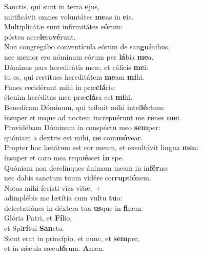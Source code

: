 \evenverse Sanctis, qui sunt in terra \textbf{e}jus,~\*\\
\evenverse mirificávit omnes voluntátes \textbf{me}as in \textbf{e}is.\\
\oddverse Multiplicátæ sunt infirmitátes e\textbf{ó}rum:~\*\\
\oddverse póstea acce\textbf{le}ra\textbf{vé}runt.\\
\evenverse Non congregábo conventícula eórum de san\textbf{guí}nibus,~\*\\
\evenverse nec memor ero nóminum eórum per \textbf{lá}bia \textbf{me}a.\\
\oddverse Dóminus pars hereditátis meæ, et cálicis \textbf{me}i:~\*\\
\oddverse tu es, qui restítues hereditátem \textbf{me}am \textbf{mi}hi.\\
\evenverse Funes cecidérunt mihi in præ\textbf{clá}ris:~\*\\
\evenverse étenim heréditas mea præ\textbf{clá}ra est \textbf{mi}hi.\\
\oddverse Benedícam Dóminum, qui tríbuit mihi intel\textbf{lé}ctum:~\*\\
\oddverse ínsuper et usque ad noctem increpuérunt me \textbf{re}nes \textbf{me}i.\\
\evenverse Providébam Dóminum in conspéctu meo \textbf{sem}per:~\*\\
\evenverse quóniam a dextris est mihi, \textbf{ne} com\textbf{mó}vear.\\
\oddverse Propter hoc lætátum est cor meum, et exsultávit lingua \textbf{me}a:~\*\\
\oddverse ínsuper et caro mea requi\textbf{é}scet \textbf{in} spe.\\
\evenverse Quóniam non derelínques ánimam meam in in\textbf{fér}no:~\*\\
\evenverse nec dabis sanctum tuum vidére cor\textbf{rup}ti\textbf{ó}nem.\\
\oddverse Notas mihi fecísti vias vitæ,~+\\
\oddverse  adimplébis me lætítia cum vultu \textbf{tu}o:~\*\\
\oddverse delectatiónes in déxtera tua \textbf{us}que in \textbf{fi}nem.\\
\evenverse Glória Patri, et \textbf{Fí}lio,~\*\\
\evenverse et Spi\textbf{rí}tui \textbf{San}cto.\\
\oddverse Sicut erat in princípio, et nunc, et \textbf{sem}per,~\*\\
\oddverse et in sǽcula sæcu\textbf{ló}rum. \textbf{A}men.\\
